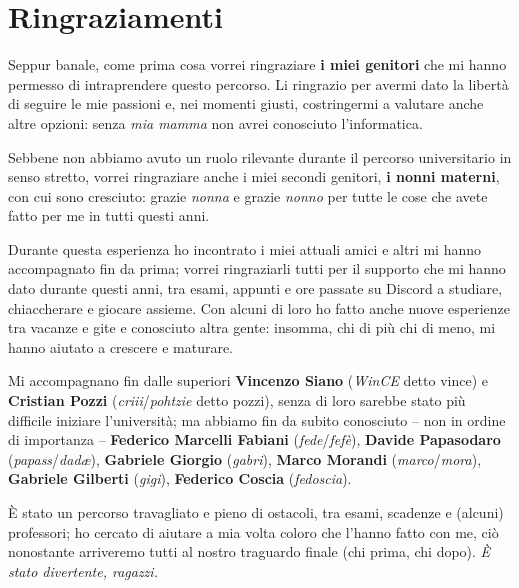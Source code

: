 
\chapter*{Ringraziamenti}
\label{chap:ringr}

Seppur banale, come prima cosa vorrei ringraziare \textbf{i miei genitori} che mi hanno permesso di
intraprendere questo percorso. Li ringrazio per avermi dato la libertà di seguire le mie passioni e, nei
momenti giusti, costringermi a valutare anche altre opzioni: senza \textit{mia mamma} non avrei
conosciuto l'informatica.

Sebbene non abbiamo avuto un ruolo rilevante durante il percorso universitario in senso stretto, vorrei
ringraziare anche i miei secondi genitori, \textbf{i nonni materni}, con cui sono cresciuto: grazie
\textit{nonna} e grazie \textit{nonno} per tutte le cose che avete fatto per me in tutti questi anni.

Durante questa esperienza ho incontrato i miei attuali amici e altri mi hanno accompagnato fin da prima;
vorrei ringraziarli tutti per il supporto che mi hanno dato durante questi anni, tra esami, appunti e ore
passate su Discord a studiare, chiaccherare e giocare assieme. Con alcuni di loro ho fatto anche nuove
esperienze tra vacanze e gite e conosciuto altra gente: insomma, chi di più chi di meno, mi hanno aiutato
a crescere e maturare. 

Mi accompagnano fin dalle superiori \textbf{Vincenzo Siano} (\textit{WinCE} detto vince) e
\textbf{Cristian Pozzi} (\textit{criii}/\textit{pohtzie} detto pozzi), senza di loro sarebbe stato più
difficile iniziare l'università; ma abbiamo fin da subito conosciuto -- non in ordine di importanza --
\textbf{Federico Marcelli Fabiani} (\textit{fede}/\textit{fefè}), \textbf{Davide Papasodaro}
(\textit{papass}/\textit{dadæ}), \textbf{Gabriele Giorgio} (\textit{gabri}), \textbf{Marco Morandi}
(\textit{marco}/\textit{mora}), \textbf{Gabriele Gilberti} (\textit{gigi}), \textbf{Federico Coscia}
(\textit{fedoscia}).

È stato un percorso travagliato e pieno di ostacoli, tra esami, scadenze e {\footnotesize(alcuni)}
professori; ho cercato di aiutare a mia volta coloro che l'hanno fatto con me, ciò nonostante arriveremo
tutti al nostro traguardo finale {\footnotesize (chi prima, chi dopo)}. 
\vskip 2cm
\raggedleft \textit{È stato divertente, ragazzi.}
